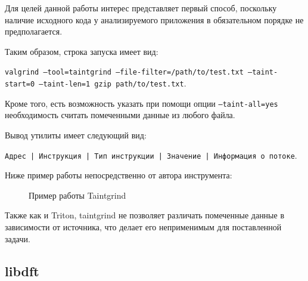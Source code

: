 Для целей данной работы интерес представляет первый способ, поскольку наличие исходного кода у анализируемого приложения в обязательном порядке не предполагается.

Таким образом, строка запуска имеет вид:
\bigskip

        \texttt{valgrind --tool=taintgrind --file-filter=/path/to/test.txt --taint-start=0 --taint-len=1 gzip path/to/test.txt}.

\bigskip
Кроме того, есть возможность указать при помощи опции \texttt{--taint-all=yes} необходимость считать помеченными данные из любого файла.

Вывод утилиты имеет следующий вид:

\mbox{\texttt{Адрес | Инструкция | Тип инструкции | Значение | Информация о потоке}}.

Ниже пример работы непосредственно от автора инструмента:

\begin{figure}[H]
    \caption{Пример работы Taintgrind}
    \label{fig:taintgrind}
\end{figure}

Также как и Triton, taintgrind не позволяет различать помеченные данные в зависимости от источника, что делает его неприменимым для поставленной задачи.

\subsection{libdft}

